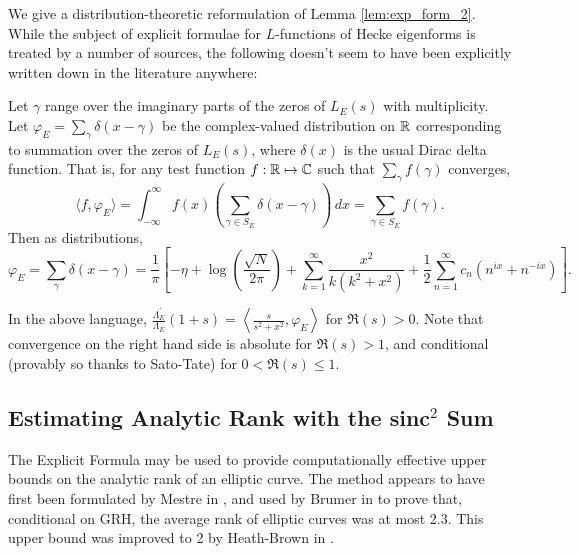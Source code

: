 \documentclass[10pt]{article}
\newcommand{\pr}{^{\prime}}
\newcommand{\Les}{L_E(s)}
\newcommand{\ldLam}[1]{\frac{\Lambda_E\pr}{\Lambda_E}\left(#1\right)}
\begin{document}
We give a distribution-theoretic reformulation of Lemma \ref{lem:exp_form_2}. While the subject of explicit formulae for $L$-functions of Hecke eigenforms is treated by a number of sources, the following doesn't seem to have been explicitly written down in the literature anywhere:
\begin{proposition}[S.]
Let $\gamma$ range over the imaginary parts of the zeros of $\Les$ with multiplicity. Let $\varphi_E = \sum_{\gamma} \delta(x-\gamma)$ be the complex-valued distribution on $\mathbb{R}$ corresponding to summation over the zeros of $L_E(s)$, where $\delta(x)$ is the usual Dirac delta function. That is, for any test function $f: \mathbb{R} \mapsto \mathbb{C}$ such that $\sum_{\gamma}f(\gamma)$ converges, 
\begin{equation}
\langle f,\varphi_E \rangle = \int_{-\infty}^{\infty} f(x)\left(\sum_{\gamma\in S_E} \delta(x-\gamma)\right) \, dx = \sum_{\gamma\in S_E} f(\gamma).
\end{equation}
Then as distributions,
\begin{equation}\label{eqn:exp_form_3}
\varphi_E = \sum_{\gamma} \delta(x-\gamma) = \frac{1}{\pi}\left[-\eta + \log\left(\frac{\sqrt{N}}{2\pi}\right) +\sum_{k=1}^{\infty} \frac{x^2}{k(k^2+x^2)} + \frac{1}{2}\sum_{n=1}^{\infty} c_n \left(n^{ix}+n^{-ix}\right) \right].
\end{equation}
\end{proposition}
In the above language, $\ldLam{1+s} = \left\langle \frac{s}{s^2+x^2},\varphi_E \right\rangle$ for $\Re(s) > 0$. Note that convergence on the right hand side is absolute for $\Re(s)>1$, and conditional (provably so thanks to Sato-Tate) for $0<\Re(s)\le 1$. \\

\newpage
\subsection{Estimating Analytic Rank with the sinc$^2$ Sum}

The Explicit Formula may be used to provide computationally effective upper bounds on the analytic rank of an elliptic curve. The method appears to have first been formulated by Mestre in \cite{Me-1986}, and used by Brumer in \cite{Bru-1992} to prove that, conditional on GRH, the average rank of elliptic curves was at most 2.3. This upper bound was improved to 2 by Heath-Brown in \cite{HeBr-2004}. \\
\end{document}
